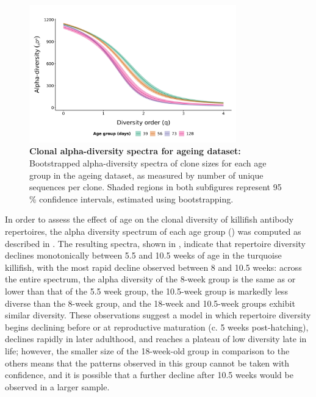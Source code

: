\begin{figure}
\centering
\includegraphics[width = 0.8\textwidth]{_Figures/png/ageing-clone-diversity-alpha}
\caption[Clonal alpha-diversity spectra for \igseq ageing dataset]{\textbf{Clonal alpha-diversity spectra for \igseq ageing dataset:} Bootstrapped alpha-diversity spectra of clone sizes for each age group in the \igseq ageing dataset, as measured by number of unique sequences per clone. Shaded regions in both subfigures represent 95\,\% confidence intervals, estimated using bootstrapping.}
\label{fig:igseq-ageing-clone-diversity-alpha}
\end{figure}

In order to assess the effect of age on the clonal diversity of killifish antibody repertoires, the alpha diversity spectrum of each age group () was computed as described in . The resulting spectra, shown in , indicate that repertoire diversity declines monotonically between 5.5 and 10.5 weeks of age in the turquoise killifish, with the most rapid decline observed between 8 and 10.5 weeks: across the entire spectrum, the alpha diversity of the 8-week group is the same as or lower than that of the 5.5 week group, the 10.5-week group is markedly less diverse than the 8-week group, and the 18-week and 10.5-week groups exhibit similar diversity. These observations suggest a model in which repertoire diversity begins declining before or at reproductive maturation (c. 5 weeks post-hatching), declines rapidly in later adulthood, and reaches a plateau of low diversity late in life; however, the smaller size of the 18-week-old group in comparison to the others means that the patterns observed in this group cannot be taken with confidence, and it is possible that a further decline after 10.5 weeks would be observed in a larger sample.

